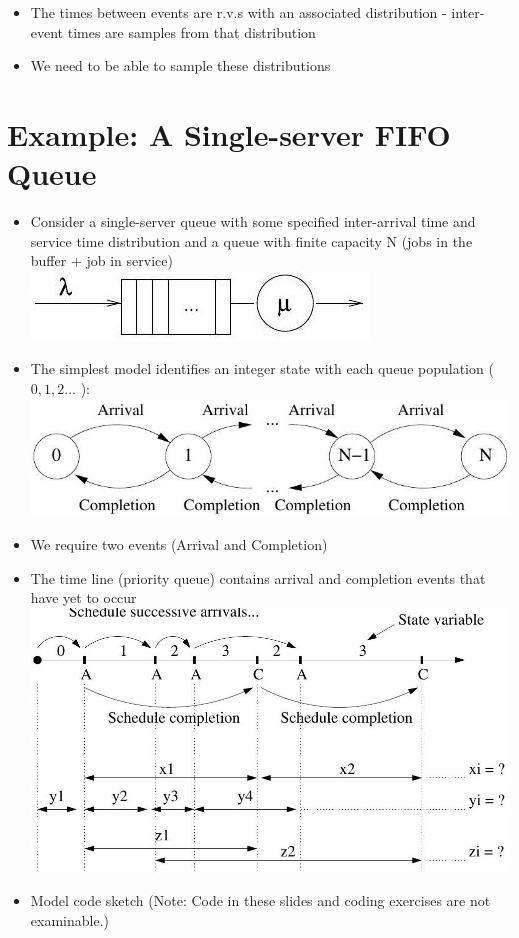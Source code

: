 \documentclass[10pt]{article}
\begin{document}
\begin{itemize}
  \item The times between events are r.v.s with an associated distribution - inter-event times are samples from that distribution
  \item We need to be able to sample these distributions
\end{itemize}

\section*{Example: A Single-server FIFO Queue}
\begin{itemize}
  \item Consider a single-server queue with some specified inter-arrival time and service time distribution and a queue with finite capacity N (jobs in the buffer + job in service)\\
\includegraphics[max width=\textwidth, center]{2025_05_12_520db7cd238ba7b44f0fg-10}
  \item The simplest model identifies an integer state with each queue population ( $0,1,2 \ldots$ ):\\
\includegraphics[max width=\textwidth, center]{2025_05_12_520db7cd238ba7b44f0fg-10(1)}
  \item We require two events (Arrival and Completion)
  \item The time line (priority queue) contains arrival and completion events that have yet to occur\\
\includegraphics[max width=\textwidth, center]{2025_05_12_520db7cd238ba7b44f0fg-11}
  \item Model code sketch (Note: Code in these slides and coding exercises are not examinable.)
\end{itemize}
\end{document}
